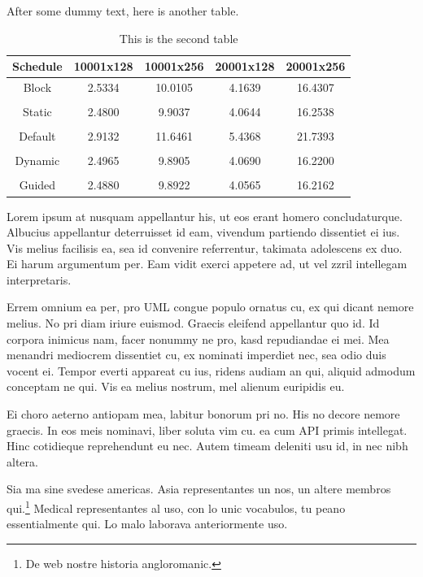 After some dummy text, here is another table. 
\begin{table}[t]
\caption{This is the second table}
\begin{center}
   \begin{tabular}{|c|c|c|c|c|}
      \hline
      \textbf{Schedule} & \textbf{10001x128} & \textbf{10001x256} & \textbf{20001x128} & \textbf{20001x256}\\ \hline
      Block & 2.5334 & 10.0105 & 4.1639 & 16.4307 \\ \hline
              & & & & \\ \hline
      Static & 2.4800 & 9.9037 & 4.0644 & 16.2538 \\ \hline
             & & & & \\ \hline
      Default & 2.9132 & 11.6461 & 5.4368 & 21.7393 \\ \hline
              & & & & \\ \hline
      Dynamic & 2.4965 & 9.8905 & 4.0690 & 16.2200 \\ \hline
             & & & & \\ \hline
      Guided & 2.4880 & 9.8922 & 4.0565 & 16.2162 \\ \hline
      \end{tabular}
\end{center}
\end{table}

Lorem ipsum at nusquam appellantur his, ut eos erant homero
concludaturque. Albucius appellantur deterruisset id eam, vivendum
partiendo dissentiet ei ius. Vis melius facilisis ea, sea id convenire
referrentur, takimata adolescens ex duo. Ei harum argumentum per. Eam
vidit exerci appetere ad, ut vel zzril intellegam interpretaris.

Errem omnium ea per, pro \ac{UML} congue populo ornatus cu, ex qui
dicant nemore melius. No pri diam iriure euismod. Graecis eleifend
appellantur quo id. Id corpora inimicus nam, facer nonummy ne pro,
kasd repudiandae ei mei. Mea menandri mediocrem dissentiet cu, ex
nominati imperdiet nec, sea odio duis vocent ei. Tempor everti
appareat cu ius, ridens audiam an qui, aliquid admodum conceptam ne
qui. Vis ea melius nostrum, mel alienum euripidis eu.

Ei choro aeterno antiopam mea, labitur bonorum pri no. His no decore
nemore graecis. In eos meis nominavi, liber soluta vim cu.
ea cum \ac{API} primis intellegat. Hinc cotidieque reprehendunt eu
nec. Autem timeam deleniti usu id, in nec nibh altera.

Sia ma sine svedese americas. Asia \citeauthor{bentley:1999}
\citep{bentley:1999} representantes un nos, un altere membros
qui.\footnote{De web nostre historia angloromanic.} Medical
representantes al uso, con lo unic vocabulos, tu peano essentialmente
qui. Lo malo laborava anteriormente uso.

